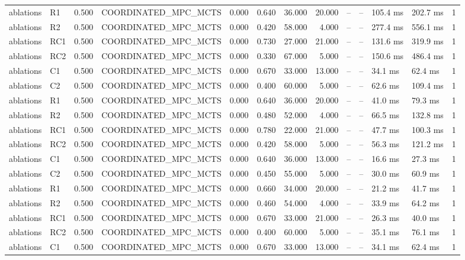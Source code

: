 \begin{table}
{\begin{tabular}{llrlrrrrrrllr}
ablations & R1 & 0.500 & COORDINATED\_MPC\_MCTS & 0.000 & 0.640 & 36.000 & 20.000 & -- & -- & 105.4 ms & 202.7 ms & 1 \\
ablations & R2 & 0.500 & COORDINATED\_MPC\_MCTS & 0.000 & 0.420 & 58.000 & 4.000 & -- & -- & 277.4 ms & 556.1 ms & 1 \\
ablations & RC1 & 0.500 & COORDINATED\_MPC\_MCTS & 0.000 & 0.730 & 27.000 & 21.000 & -- & -- & 131.6 ms & 319.9 ms & 1 \\
ablations & RC2 & 0.500 & COORDINATED\_MPC\_MCTS & 0.000 & 0.330 & 67.000 & 5.000 & -- & -- & 150.6 ms & 486.4 ms & 1 \\
ablations & C1 & 0.500 & COORDINATED\_MPC\_MCTS & 0.000 & 0.670 & 33.000 & 13.000 & -- & -- & 34.1 ms & 62.4 ms & 1 \\
ablations & C2 & 0.500 & COORDINATED\_MPC\_MCTS & 0.000 & 0.400 & 60.000 & 5.000 & -- & -- & 62.6 ms & 109.4 ms & 1 \\
ablations & R1 & 0.500 & COORDINATED\_MPC\_MCTS & 0.000 & 0.640 & 36.000 & 20.000 & -- & -- & 41.0 ms & 79.3 ms & 1 \\
ablations & R2 & 0.500 & COORDINATED\_MPC\_MCTS & 0.000 & 0.480 & 52.000 & 4.000 & -- & -- & 66.5 ms & 132.8 ms & 1 \\
ablations & RC1 & 0.500 & COORDINATED\_MPC\_MCTS & 0.000 & 0.780 & 22.000 & 21.000 & -- & -- & 47.7 ms & 100.3 ms & 1 \\
ablations & RC2 & 0.500 & COORDINATED\_MPC\_MCTS & 0.000 & 0.420 & 58.000 & 5.000 & -- & -- & 56.3 ms & 121.2 ms & 1 \\
ablations & C1 & 0.500 & COORDINATED\_MPC\_MCTS & 0.000 & 0.640 & 36.000 & 13.000 & -- & -- & 16.6 ms & 27.3 ms & 1 \\
ablations & C2 & 0.500 & COORDINATED\_MPC\_MCTS & 0.000 & 0.450 & 55.000 & 5.000 & -- & -- & 30.0 ms & 60.9 ms & 1 \\
ablations & R1 & 0.500 & COORDINATED\_MPC\_MCTS & 0.000 & 0.660 & 34.000 & 20.000 & -- & -- & 21.2 ms & 41.7 ms & 1 \\
ablations & R2 & 0.500 & COORDINATED\_MPC\_MCTS & 0.000 & 0.460 & 54.000 & 4.000 & -- & -- & 33.9 ms & 64.2 ms & 1 \\
ablations & RC1 & 0.500 & COORDINATED\_MPC\_MCTS & 0.000 & 0.670 & 33.000 & 21.000 & -- & -- & 26.3 ms & 40.0 ms & 1 \\
ablations & RC2 & 0.500 & COORDINATED\_MPC\_MCTS & 0.000 & 0.400 & 60.000 & 5.000 & -- & -- & 35.1 ms & 76.1 ms & 1 \\
ablations & C1 & 0.500 & COORDINATED\_MPC\_MCTS & 0.000 & 0.670 & 33.000 & 13.000 & -- & -- & 34.1 ms & 62.4 ms & 1 \\

\end{tabular}}
\end{table}

